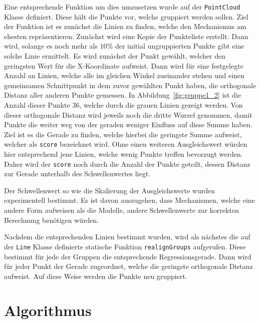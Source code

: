 Eine entsprechende Funktion um dies umzusetzen wurde auf der \lstinline{PointCloud} Klasse definiert.
Diese hält die Punkte vor, welche gruppiert werden sollen.
Ziel der Funktion ist es zunächst die Linien zu finden, welche den Mechanismus am ehesten repräsentieren.
Zunächst wird eine Kopie der Punkteliste erstellt.
Dann wird, solange es noch mehr als $10\%$ der initial ungruppierten Punkte gibt eine solche Linie ermittelt.
Es wird zunächst der Punkt gewählt, welcher den geringsten Wert für die X-Koordinate aufweist.
Dann wird für eine festgelegte Anzahl an Linien, welche alle im gleichen Winkel zueinander stehen und einen gemeinsamen Schnittpunkt in dem zuvor gewählten Punkt haben, die orthogonale Distanz aller anderen Punkte gemessen.
In Abbildung~\ref{fig:gruppe1_2} ist die Anzahl dieser Punkte 36, welche durch die grauen Linien gezeigt werden.
Von dieser orthogonale Distanz wird jeweils noch die dritte Wurzel genommen, damit Punkte die weiter weg von der geraden weniger Einfluss auf diese Summe haben.
Ziel ist es die Gerade zu finden, welche hierbei die geringste Summe aufweist, welcher als \lstinline{score} bezeichnet wird.
Ohne einen weiteren Ausgleichswert würden hier entsprechend jene Linien, welche wenig Punkte treffen bevorzugt werden.
Daher wird der \lstinline{score} noch durch die Anzahl der Punkte geteilt, dessen Distanz zur Gerade unterhalb des Schwellenwertes liegt.

Der Schwellenwert so wie die Skalierung der Ausgleichswerte wurden experimentell bestimmt.
Es ist davon auszugehen, dass Mechanismen, welche eine andere Form aufweisen als die  Modelle, andere Schwellenwerte zur korrekten Berechnung benötigen würden.

Nachdem die entsprechenden Linien bestimmt wurden, wird als nächstes die auf der \lstinline{Line} Klasse definierte statische Funktion \lstinline{realignGroups} aufgerufen.
Diese bestimmt für jede der Gruppen die entsprechende Regressionsgerade.
Dann wird für jeder Punkt der Gerade zugeordnet, welche die geringste orthogonale Distanz aufweist.
Auf diese Weise werden die Punkte neu gruppiert.

\section{ Algorithmus}\label{ch:kMeans}

